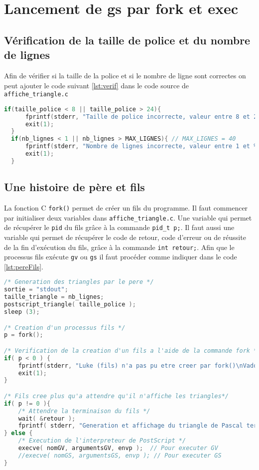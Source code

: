 \section{Lancement de gs par fork et exec}
\subsection{Vérification de la taille de police et du nombre de lignes}

Afin de vérifier si la taille de la police et si le nombre de ligne sont correctes on peut ajouter le code suivant \ref{lst:verif} dans le code source de \verb!affiche_triangle.c!

\begin{lstlisting}[language=C, label={lst:verif}, caption={Vérification de la taille de police comprise entre 8 et 24, et du nombre de lignes comprit entre 1 et 40.}]
  if(taille_police < 8 || taille_police > 24){
	  fprintf(stderr, "Taille de police incorrecte, valeur entre 8 et 24 attendue\n");
	  exit(1);
  }
  if(nb_lignes < 1 || nb_lignes > MAX_LIGNES){ // MAX_LIGNES = 40
	  fprintf(stderr, "Nombre de lignes incorrecte, valeur entre 1 et %d attendue\n", MAX_LIGNES);
	  exit(1);
  }
\end{lstlisting}

\subsection{Une histoire de père et fils}
La fonction C \verb!fork()! permet de créer un fils du programme. 
Il faut commencer par initialiser deux variables dans \verb!affiche_triangle.c!.
Une variable qui permet de récupérer le \verb!pid! du fils grâce à la commande \verb!pid_t p;!.
Il faut aussi une variable qui permet de récupérer le code de retour, code d'erreur ou de réussite de la fin d'exécution du fils, grâce à la commande \verb!int retour;!.
Afin que le processus fils exécute \verb!gv! ou \verb!gs! il faut procéder comme indiquer dans le code \ref{lst:pereFils}.

\begin{lstlisting}[language=C, label={lst:pereFils}, caption=Création d'un fils qui exécute la fonction execve() permettant la lecture du fichier PostScript par un interpréteur de PostScript.]
/* Generation des triangles par le pere */
sortie = "stdout";
taille_triangle = nb_lignes;
postscript_triangle( taille_police );
sleep (3);

/* Creation d'un processus fils */
p = fork();

/* Verification de la creation d'un fils a l'aide de la commande fork */
if( p < 0 ) {
	fprintf(stderr, "Luke (fils) n'a pas pu etre creer par fork()\nVador (pere) est triste\n");
	exit(1);
}

/* Fils cree plus qu'a attendre qu'il n'affiche les triangles*/
if( p != 0 ){
	/* Attendre la terminaison du fils */
	wait( &retour );
	fprintf( stderr, "Generation et affichage du triangle de Pascal termine\n" );
} else {	
	/* Execution de l'interpreteur de PostScript */
	execve( nomGV, argumentsGV, envp );  // Pour executer GV
	//execve( nomGS, argumentsGS, envp ); // Pour executer GS
}
\end{lstlisting}
